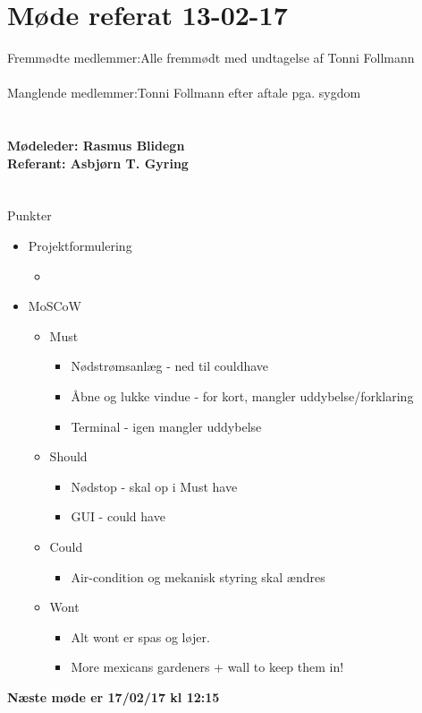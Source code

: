 \documentclass[12pt]{article}
\begin{document}
\section*{Møde referat 13-02-17}

Fremmødte medlemmer:Alle fremmødt med undtagelse af Tonni Follmann\\\\
Manglende medlemmer:Tonni Follmann efter aftale pga. sygdom\\\\ 
\\\textbf{Mødeleder: Rasmus Blidegn}
\\\textbf{Referant: Asbjørn T. Gyring}
\\\\\\
Punkter
\begin{itemize}
	\item Projektformulering
	\begin{itemize}
		\item
	\end{itemize}
	\item MoSCoW
	\begin{itemize}
		\item Must
		\begin{itemize}
			\item Nødstrømsanlæg - ned til couldhave
			\item Åbne og lukke vindue - for kort, mangler uddybelse/forklaring
			\item Terminal - igen mangler uddybelse
		\end{itemize}
		\item Should
		\begin{itemize}
			\item Nødstop - skal op i Must have
			\item GUI - could have
		\end{itemize}
		\item Could
		\begin{itemize}
			\item Air-condition og mekanisk styring skal ændres
		\end{itemize}
		\item Wont
		\begin{itemize}
			\item Alt wont er spas og løjer.
			\item More mexicans gardeners + wall to keep them in!
		\end{itemize}
	\end{itemize}
\end{itemize}

\large{\textbf{Næste møde er 17/02/17 kl 12:15 }}
\end{document}
